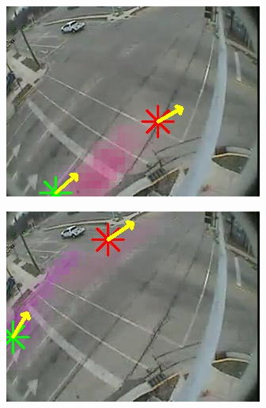 \begin{figure}
\begin{subfigure}{0.32\linewidth}
            \includegraphics[width=\linewidth]{./img/scene_learning/res/intersection_4/intersection_4-2.jpg}
        \end{subfigure}
        \begin{subfigure}{0.32\linewidth}
            \includegraphics[width=\linewidth]{./img/scene_learning/res/intersection_4/intersection_4-3.jpg}
        \end{subfigure}
        \begin{subfigure}{0.32\linewidth}

\end{subfigure}
\end{figure}
